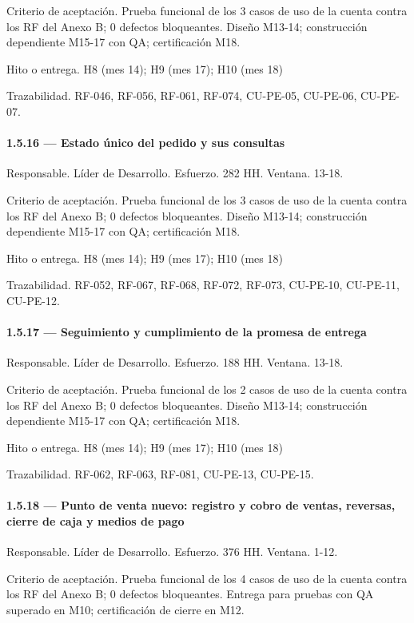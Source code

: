 \documentclass[11pt]{article}
\begin{document}
Criterio de aceptación. Prueba funcional de los 3 casos de uso de la cuenta contra los RF del Anexo B; 0 defectos bloqueantes. Diseño M13-14; construcción dependiente M15-17 con QA; certificación M18.

Hito o entrega. H8 (mes 14); H9 (mes 17); H10 (mes 18)

Trazabilidad. RF-046, RF-056, RF-061, RF-074, CU-PE-05, CU-PE-06, CU-PE-07.

\paragraph{1.5.16 — Estado único del pedido y sus consultas}

Responsable. Líder de Desarrollo. Esfuerzo. 282 HH. Ventana. 13-18.

Criterio de aceptación. Prueba funcional de los 3 casos de uso de la cuenta contra los RF del Anexo B; 0 defectos bloqueantes. Diseño M13-14; construcción dependiente M15-17 con QA; certificación M18.

Hito o entrega. H8 (mes 14); H9 (mes 17); H10 (mes 18)

Trazabilidad. RF-052, RF-067, RF-068, RF-072, RF-073, CU-PE-10, CU-PE-11, CU-PE-12.

\paragraph{1.5.17 — Seguimiento y cumplimiento de la promesa de entrega}

Responsable. Líder de Desarrollo. Esfuerzo. 188 HH. Ventana. 13-18.

Criterio de aceptación. Prueba funcional de los 2 casos de uso de la cuenta contra los RF del Anexo B; 0 defectos bloqueantes. Diseño M13-14; construcción dependiente M15-17 con QA; certificación M18.

Hito o entrega. H8 (mes 14); H9 (mes 17); H10 (mes 18)

Trazabilidad. RF-062, RF-063, RF-081, CU-PE-13, CU-PE-15.

\paragraph{1.5.18 — Punto de venta nuevo: registro y cobro de ventas, reversas, cierre de caja y medios de pago}

Responsable. Líder de Desarrollo. Esfuerzo. 376 HH. Ventana. 1-12.

Criterio de aceptación. Prueba funcional de los 4 casos de uso de la cuenta contra los RF del Anexo B; 0 defectos bloqueantes. Entrega para pruebas con QA superado en M10; certificación de cierre en M12.
\end{document}
